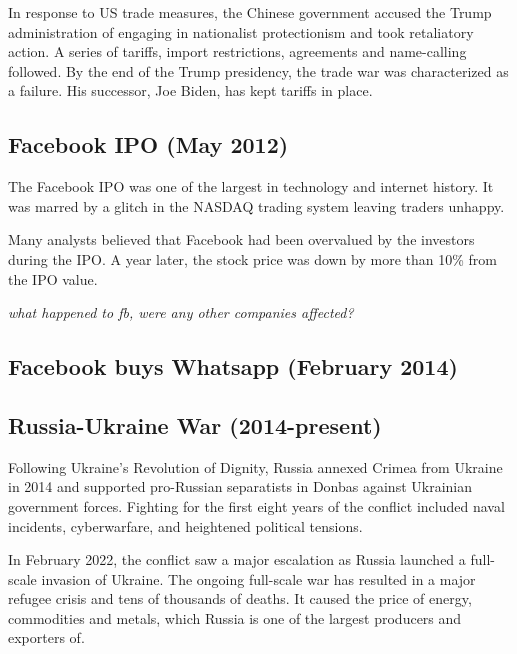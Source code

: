 \documentclass[11pt, twocolumn]{article}
\begin{document}
\begin{justify}
In response to US trade measures, the Chinese government accused the Trump administration of engaging in nationalist protectionism and took retaliatory action. A series of tariffs, import restrictions, agreements and name-calling followed. By the end of the Trump presidency, the trade war was characterized as a failure. His successor, Joe Biden, has kept tariffs in place.
\vspace{-5pt}



\subsection{Facebook IPO (May 2012)}
The Facebook IPO was one of the largest in technology and internet history. 
It was marred by a glitch in the 
NASDAQ trading system leaving traders unhappy. 

\vspace{1em}
Many analysts believed that Facebook had been overvalued by the investors during the IPO.
A year later, the stock price was down by more than 10\% from the IPO value.

\textit{what happened to fb, were any other companies affected?}
\vspace{-5pt}


\subsection{Facebook buys Whatsapp (February 2014)}
\vspace{-5pt}


\subsection{Russia-Ukraine War (2014-present)}
Following Ukraine's Revolution of Dignity, Russia annexed Crimea from Ukraine in 2014 and supported pro-Russian separatists in Donbas against Ukrainian government forces.
Fighting for the first eight years of the conflict included naval incidents, cyberwarfare, and heightened political tensions.
\vspace{1em}


In February 2022, the conflict saw a major escalation as Russia launched a full-scale invasion of Ukraine. The ongoing full-scale war has resulted in a major refugee crisis and tens of thousands of deaths. It caused the price of energy, commodities and metals, which Russia is one of the largest producers and exporters of.


\end{justify}
\end{document}
